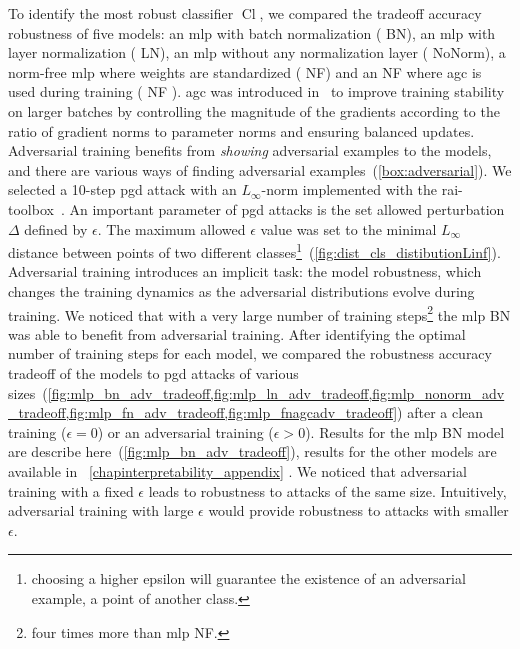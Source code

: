 \documentclass[../main.tex]{subfiles}
\begin{document}
		To identify the most robust classifier \(\operatorname{Cl}\), we compared the tradeoff accuracy robustness of five models: an \gls{mlp} with batch normalization ( BN), an \gls{mlp} with layer normalization ( LN), an \gls{mlp} without any normalization layer ( NoNorm), a norm-free \gls{mlp} where weights are standardized ( NF) and an  NF where \gls{agc} is used during training ( NF ).
		\Gls{agc} was introduced in~\cite{NoNormApplied} to improve training stability on larger batches by controlling the magnitude of the gradients according to the ratio of gradient norms to parameter norms and ensuring balanced updates.
		Adversarial training benefits from \textit{showing} adversarial examples to the models, and there are various ways of finding adversarial examples~(\cref{box:adversarial}).
		We selected a 10-step \gls{pgd} attack with an \(L_{\infty}\)-norm implemented with the {\sourcecode rai-toolbox}~\cite{soklaski2022toolspracticesresponsibleai}.
		An important parameter of \gls{pgd} attacks is the set allowed perturbation \(\Delta\) defined by \(\epsilon\).
		The maximum allowed \(\epsilon\) value was set to the minimal \(L_{\infty}\) distance between points of two different classes\footnote{choosing a higher epsilon will guarantee the existence of an adversarial example, \ie{} a point of another class.}~(\cref{fig:dist_cls_distibutionLinf}).
		Adversarial training introduces an implicit task: the model robustness, which changes the training dynamics as the adversarial distributions evolve during training.
		We noticed that with a very large number of training steps\footnote{four times more than \gls{mlp} NF.} the \gls{mlp} BN was able to benefit from adversarial training.
		After identifying the optimal number of training steps for each model, we compared the robustness accuracy tradeoff of the models to \gls{pgd} attacks of various sizes~(\cref{fig:mlp_bn_adv_tradeoff,fig:mlp_ln_adv_tradeoff,fig:mlp_nonorm_adv_tradeoff,fig:mlp_fn_adv_tradeoff,fig:mlp_fnagcadv_tradeoff}) after a clean training (\(\epsilon = 0\)) or an adversarial training (\(\epsilon > 0\)).
		Results for the \gls{mlp} BN model are describe here~(\cref{fig:mlp_bn_adv_tradeoff}), results for the other models  are available in~ \cref{chapinterpretability_appendix} .
		We noticed that adversarial training with a fixed \(\epsilon\) leads to robustness to attacks of the same size.
		Intuitively, adversarial training with large \(\epsilon\) would provide robustness to attacks with smaller \(\epsilon\).
\end{document}

